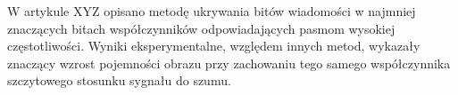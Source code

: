 {    %
    W artykule XYZ opisano metodę ukrywania bitów wiadomości w najmniej znaczących bitach współczynników odpowiadających pasmom wysokiej częstotliwości.
    Wyniki eksperymentalne, względem innych metod, wykazały znaczący wzrost pojemności obrazu przy zachowaniu tego samego współczynnika szczytowego
    stosunku sygnału do szumu.

}


